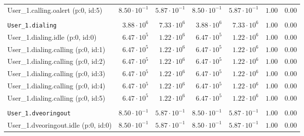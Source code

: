 \begin{table}[htbp]
{\begin{tabular}{lrrrrrr}
\hspace{3mm}User\_1.calling.oalert (p:0, id:5)       & $8.50 \cdot 10^{-1}$ & $5.87 \cdot 10^{-1}$ & $8.50 \cdot 10^{-1}$ & $5.87 \cdot 10^{-1}$ &               $1.00$ &               $0.00$ \\
\\[-8pt]\texttt{User\_1.dialing}                     &  $3.88 \cdot 10^{6}$ &  $7.33 \cdot 10^{6}$ &  $3.88 \cdot 10^{6}$ &  $7.33 \cdot 10^{6}$ &               $1.00$ &               $0.00$ \\
\hspace{3mm}User\_1.dialing.idle (p:0, id:0)         &  $6.47 \cdot 10^{5}$ &  $1.22 \cdot 10^{6}$ &  $6.47 \cdot 10^{5}$ &  $1.22 \cdot 10^{6}$ &               $1.00$ &               $0.00$ \\
\hspace{3mm}User\_1.dialing.calling (p:0, id:1)      &  $6.47 \cdot 10^{5}$ &  $1.22 \cdot 10^{6}$ &  $6.47 \cdot 10^{5}$ &  $1.22 \cdot 10^{6}$ &               $1.00$ &               $0.00$ \\
\hspace{3mm}User\_1.dialing.calling (p:0, id:2)      &  $6.47 \cdot 10^{5}$ &  $1.22 \cdot 10^{6}$ &  $6.47 \cdot 10^{5}$ &  $1.22 \cdot 10^{6}$ &               $1.00$ &               $0.00$ \\
\hspace{3mm}User\_1.dialing.calling (p:0, id:3)      &  $6.47 \cdot 10^{5}$ &  $1.22 \cdot 10^{6}$ &  $6.47 \cdot 10^{5}$ &  $1.22 \cdot 10^{6}$ &               $1.00$ &               $0.00$ \\
\hspace{3mm}User\_1.dialing.calling (p:0, id:4)      &  $6.47 \cdot 10^{5}$ &  $1.22 \cdot 10^{6}$ &  $6.47 \cdot 10^{5}$ &  $1.22 \cdot 10^{6}$ &               $1.00$ &               $0.00$ \\
\hspace{3mm}User\_1.dialing.calling (p:0, id:5)      &  $6.47 \cdot 10^{5}$ &  $1.22 \cdot 10^{6}$ &  $6.47 \cdot 10^{5}$ &  $1.22 \cdot 10^{6}$ &               $1.00$ &               $0.00$ \\
\\[-8pt]\texttt{User\_1.dveoringout}                 & $8.50 \cdot 10^{-1}$ & $5.87 \cdot 10^{-1}$ & $8.50 \cdot 10^{-1}$ & $5.87 \cdot 10^{-1}$ &               $1.00$ &               $0.00$ \\
\hspace{3mm}User\_1.dveoringout.idle (p:0, id:0)     & $8.50 \cdot 10^{-1}$ & $5.87 \cdot 10^{-1}$ & $8.50 \cdot 10^{-1}$ & $5.87 \cdot 10^{-1}$ &               $1.00$ &               $0.00$ \\

\end{tabular}}
\end{table}
